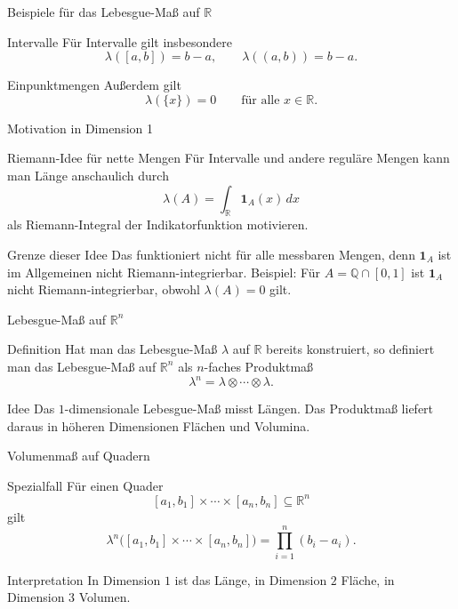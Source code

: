 \documentclass{beamer}
\begin{document}
\begin{frame}{Beispiele für das Lebesgue-Maß auf \(\mathbb R\)}
\begin{block}{Intervalle}
Für Intervalle gilt insbesondere
\[
\lambda([a,b])=b-a,
\qquad
\lambda((a,b))=b-a.
\]
\end{block}

\begin{block}{Einpunktmengen}
Außerdem gilt
\[
\lambda(\{x\})=0
\qquad\text{für alle } x\in\mathbb R.
\]
\end{block}
\end{frame}

\begin{frame}{Motivation in Dimension 1}
\begin{block}{Riemann-Idee für nette Mengen}
Für Intervalle und andere reguläre Mengen kann man Länge anschaulich durch
\[
\lambda(A)=\int_{\mathbb R} \mathbf 1_A(x)\,dx
\]
als Riemann-Integral der Indikatorfunktion motivieren.
\end{block}

\begin{block}{Grenze dieser Idee}
Das funktioniert nicht für alle messbaren Mengen, denn \(\mathbf 1_A\) ist im Allgemeinen
nicht Riemann-integrierbar.
\newline
Beispiel: Für \(A=\mathbb Q\cap[0,1]\) ist \(\mathbf 1_A\) nicht Riemann-integrierbar,
obwohl \(\lambda(A)=0\) gilt.
\end{block}
\end{frame}

\begin{frame}{Lebesgue-Maß auf \(\mathbb R^n\)}
\begin{block}{Definition}
Hat man das Lebesgue-Maß \(\lambda\) auf \(\mathbb R\) bereits konstruiert, so definiert man das Lebesgue-Maß auf \(\mathbb R^n\) als \(n\)-faches Produktmaß
\[
\lambda^n=\lambda\otimes\cdots\otimes\lambda.
\]
\end{block}

\begin{block}{Idee}
Das \(1\)-dimensionale Lebesgue-Maß misst Längen.
Das Produktmaß liefert daraus in höheren Dimensionen Flächen und Volumina.
\end{block}
\end{frame}

\begin{frame}{Volumenmaß auf Quadern}
\begin{block}{Spezialfall}
Für einen Quader
\[
[a_1,b_1]\times\cdots\times[a_n,b_n]\subseteq\mathbb R^n
\]
gilt
\[
\lambda^n\bigl([a_1,b_1]\times\cdots\times[a_n,b_n]\bigr)
=
\prod_{i=1}^n (b_i-a_i).
\]
\end{block}

\begin{block}{Interpretation}
In Dimension \(1\) ist das Länge, in Dimension \(2\) Fläche, in Dimension \(3\) Volumen.
\end{block}
\end{frame}
\end{document}
